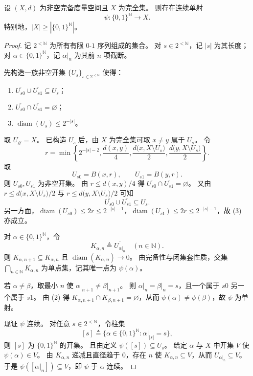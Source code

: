 \documentclass[lang=cn,a4paper,newtx,figureplace=section,tableplace=section]{elegantbook}
\begin{document}
\begin{lemma}\label{lem:cantor-embedding}
  设 $(X,d)$ 为非空完备度量空间且 $X$ 为完全集。
  则存在连续单射
  \[
    \psi:\{0,1\}^{\mathbb{N}}\to X.
  \]
  特别地，$|X|\ge |\{0,1\}^{\mathbb{N}}|$。
\end{lemma}
\begin{proof}
  记 $2^{<\mathbb{N}}$ 为所有有限 $0$-$1$ 序列组成的集合。
  对 $s\in 2^{<\mathbb{N}}$，记 $|s|$ 为其长度；对 $\alpha\in\{0,1\}^{\mathbb{N}}$，记 $\alpha\vert_n$ 为其前 $n$ 项截断。

  先构造一族非空开集 $\{U_s\}_{s\in 2^{<\mathbb{N}}}$ 使得：
  \begin{enumerate}
    \item $\overline{U_{s0}}\cup\overline{U_{s1}}\subseteq U_s$；
    \item $\overline{U_{s0}}\cap\overline{U_{s1}}=\varnothing$；
    \item $\operatorname{diam}(U_s)\le 2^{-|s|}$。
  \end{enumerate}
  取 $U_\varnothing=X$。
  已构造 $U_s$ 后，由 $X$ 为完全集可取 $x\ne y$ 属于 $U_s$。
  令
  \[
    r=\min\left\{2^{-|s|-2},\frac{d(x,y)}{4},\frac{d\bigl(x,X\setminus U_s\bigr)}{2},\frac{d\bigl(y,X\setminus U_s\bigr)}{2}\right\}.
  \]
  取
  \[
    U_{s0}=B(x,r),\qquad U_{s1}=B(y,r).
  \]
  则 $U_{s0},U_{s1}$ 为非空开集。
  由 $r\le d(x,y)/4$ 得 $\overline{U_{s0}}\cap\overline{U_{s1}}=\varnothing$。
  又由 $r\le d\bigl(x,X\setminus U_s\bigr)/2$ 与 $r\le d\bigl(y,X\setminus U_s\bigr)/2$ 可知
  \[
    \overline{U_{s0}}\cup\overline{U_{s1}}\subseteq U_s.
  \]
  另一方面，$\operatorname{diam}(U_{s0})\le 2r\le 2^{-|s|-1}$，$\operatorname{diam}(U_{s1})\le 2r\le 2^{-|s|-1}$，故 (3) 亦成立。

  对 $\alpha\in\{0,1\}^{\mathbb{N}}$，令
  \[
    K_{\alpha,n}\triangleq\overline{U_{\alpha\vert_n}}\quad(n\in\mathbb{N}).
  \]
  则 $K_{\alpha,n+1}\subseteq K_{\alpha,n}$ 且 $\operatorname{diam}(K_{\alpha,n})\to 0$。
  由完备性与闭集套性质，交集 $\bigcap_{n\in\mathbb{N}}K_{\alpha,n}$ 为单点集，记其唯一点为 $\psi(\alpha)$。

  若 $\alpha\ne\beta$，取最小 $n$ 使 $\alpha\vert_{n+1}\ne\beta\vert_{n+1}$。
  则 $\alpha\vert_n=\beta\vert_n=s$，且一个属于 $s0$ 另一个属于 $s1$。
  由 (2) 得 $K_{\alpha,n+1}\cap K_{\beta,n+1}=\varnothing$，从而 $\psi(\alpha)\ne\psi(\beta)$，故 $\psi$ 为单射。

  现证 $\psi$ 连续。
  对任意 $s\in 2^{<\mathbb{N}}$，令柱集
  \[
    [s]\triangleq\{\alpha\in\{0,1\}^{\mathbb{N}}: \alpha\vert_{|s|}=s\},
  \]
  则 $[s]$ 为 $\{0,1\}^{\mathbb{N}}$ 的开集。
  且由定义 $\psi([s])\subseteq U_s$。
  给定 $\alpha$ 与 $X$ 中开集 $V$ 使 $\psi(\alpha)\in V$。
  由 $K_{\alpha,n}$ 递减且直径趋于 $0$，存在 $n$ 使 $K_{\alpha,n}\subseteq V$，从而 $U_{\alpha\vert_n}\subseteq V$。
  于是 $\psi([\alpha\vert_n])\subseteq V$，即 $\psi$ 于 $\alpha$ 连续。
\end{proof}
\end{document}
